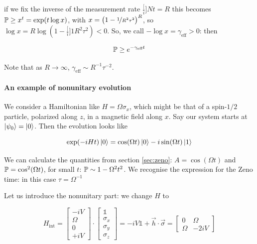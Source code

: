 \documentclass[main.tex]{subfiles}
\begin{document}
if we fix the inverse of the measurement rate \(\frac[i]{N}{t} = R\) this becomes \(\P \geq x^t = \exp(t \log x) \), with \(x = \qty(1 - \frac[i]{1}{R^2\tau^2})^R\), so \(\log x =  R \log(1- \frac[i]{1}{R^2 \tau^2} ) < 0\). So, we call \(-\log x = \gamma_{\text{eff}}>0 \): then

\begin{equation}
    \P \geq e^{-\gamma _{\text{eff}} t }
\end{equation}

Note that as \(R \rightarrow \infty\), \(\gamma _{\text{eff}} \sim R^{-1}\tau^{-2}\).

\paragraph{An example of nonunitary evolution}

We consider a Hamiltonian like \(H = \Omega \sigma_x \), which might be that of a spin-$1/2$ particle, polarized along \(z\), in a magnetic field along \(x\). Say our system starts at \(\ket{\psi _0}  = \ket{0} \). Then the evolution looks like

\begin{equation}
    \exp(-iHt) \ket{0} = \cos(\Omega t) \ket{0} -i \sin(\Omega t) \ket{1}
\end{equation}

We can calculate the quantities from section \ref{sec:zeno}: \(A = \cos(\Omega t) \) and \(\P = \cos^2(\Omega t)\), for small \(t\):  \(\P \sim 1- \Omega^2  t^2\). We recognise the expression for the Zeno time: in this case \(\tau = \Omega^{-1}\)

Let us introduce the nonunitary part: we change \(H\) to

\begin{equation} \label{eq:interaction-hamiltonian}
    H _{\text{int}}  = \begin{bmatrix}
    -iV \\
    \Omega  \\
    0    \\
    +iV
\end{bmatrix}
    \cdot
    \begin{bmatrix}
    \mathbb 1 \\
    \sigma_x  \\
    \sigma_y  \\
    \sigma_z
\end{bmatrix}
    =
    -iV \mathbb 1 + \vec{h} \cdot \vec{\sigma}
    =
    \begin{bmatrix}
    0   & \Omega   \\
    \Omega  & -2iV
\end{bmatrix}
\end{equation}
\end{document}

